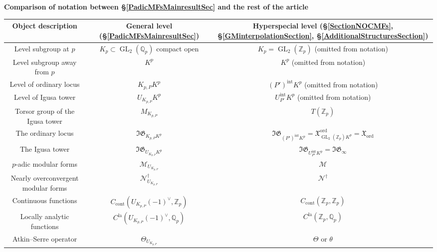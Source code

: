 \documentclass[10pt, oneside]{amsart}
\numberwithin{equation}{subsection}
\theoremstyle{definition}
\theoremstyle{remark}
\newcommand{\mbb}[1]{\mathbb{#1}}
\newcommand{\opn}[1]{\operatorname{#1}}
\begin{document}
\vspace{0.3cm}
\begin{center}
    \textbf{Comparison of notation between \S \ref{PadicMFsMainresultSec} and the rest of the article}
\end{center}
\vspace{0.3cm}

\begin{center}
    \begin{tabular}{c|c|c}
     Object description & General level (\S \ref{PadicMFsMainresultSec}) & Hyperspecial level (\S \ref{SectionNOCMFs}, \S \ref{GMinterpolationSection}, \S \ref{AdditionalStructuresSection})  \\
     \hline 
     Level subgroup at $p$  & $K_p \subset \opn{GL}_2(\mbb{Q}_p)$ compact open & $K_p = \opn{GL}_2(\mbb{Z}_p)$ (omitted from notation) \\
     Level subgroup away from $p$  & $K^p$ & $K^p$ (omitted from notation) \\
     Level of ordinary locus  & $K_{p, P} K^p$ & $(P')^{\opn{int}}K^p$ (omitted from notation) \\
     Level of Igusa tower  & $U_{K_{p, P}}K^p$ & $U_{P'}^{\opn{int}}K^p$ (omitted from notation) \\
     Torsor group of the Igusa tower  & $M_{K_{p, P}}$ & $T(\mbb{Z}_p)$ \\
     The ordinary locus  & $\mathfrak{IG}_{K_{p, P}K^p}$ & $\mathfrak{IG}_{(P')^{\opn{int}}K^p} = \mathfrak{X}^{\opn{ord}}_{\opn{GL}_2(\mbb{Z}_p)K^p} = \mathfrak{X}_{\opn{ord}}$ \\
     The Igusa tower  & $\mathfrak{IG}_{U_{K_{p, P}}K^p}$ & $\mathfrak{IG}_{U_{P'}^{\opn{int}}K^p} = \mathfrak{IG}_{\infty}$ \\
     $p$-adic modular forms  & $\mathscr{M}_{U_{K_{p, P}}}$ & $\mathscr{M}$ \\
     Nearly overconvergent modular forms  & $\mathscr{N}^{\dagger}_{U_{K_{p, P}}}$ & $\mathscr{N}^{\dagger}$ \\
     Continuous functions  & $C_{\opn{cont}}(U_{K_{p, P}}(-1)^{\vee}, \mbb{Z}_p)$  & $C_{\opn{cont}}(\mbb{Z}_p, \mbb{Z}_p)$ \\
     Locally analytic functions  & $C^{\opn{la}}(U_{K_{p, P}}(-1)^{\vee}, \mbb{Q}_p)$ & $C^{\opn{la}}(\mbb{Z}_p, \mbb{Q}_p)$ \\
     Atkin--Serre operator  & $\Theta_{U_{K_{p, P}}}$ & $\Theta$ or $\theta$
    \end{tabular}
\end{center}
\end{document}
